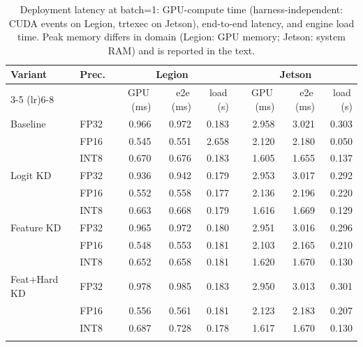 \begin{table}[t]
\centering
\caption{Deployment latency at batch=1: GPU-compute time (harness-independent: CUDA events on Legion, trtexec on Jetson), end-to-end latency, and engine load time. Peak memory differs in domain (Legion: GPU memory; Jetson: system RAM) and is reported in the text.}
\label{tab:deploy}
\begin{tabular}{llrrrrrr}
\toprule
Variant & Prec. & \multicolumn{3}{c}{\textbf{Legion}} & \multicolumn{3}{c}{\textbf{Jetson}} \\
\cmidrule(lr){3-5} \cmidrule(lr){6-8}
 &  & GPU\,(ms) & e2e\,(ms) & load\,(s) & GPU\,(ms) & e2e\,(ms) & load\,(s) \\
\midrule
Baseline & FP32 & 0.966 & 0.972 & 0.183 & 2.958 & 3.021 & 0.303 \\
 & FP16 & 0.545 & 0.551 & 2.658 & 2.120 & 2.180 & 0.050 \\
 & INT8 & 0.670 & 0.676 & 0.183 & 1.605 & 1.655 & 0.137 \\
\addlinespace[2pt]
Logit KD & FP32 & 0.936 & 0.942 & 0.179 & 2.953 & 3.017 & 0.292 \\
 & FP16 & 0.552 & 0.558 & 0.177 & 2.136 & 2.196 & 0.220 \\
 & INT8 & 0.663 & 0.668 & 0.179 & 1.616 & 1.669 & 0.129 \\
\addlinespace[2pt]
Feature KD & FP32 & 0.965 & 0.972 & 0.180 & 2.951 & 3.016 & 0.296 \\
 & FP16 & 0.548 & 0.553 & 0.181 & 2.103 & 2.165 & 0.210 \\
 & INT8 & 0.652 & 0.658 & 0.181 & 1.620 & 1.670 & 0.130 \\
\addlinespace[2pt]
Feat+Hard KD & FP32 & 0.978 & 0.985 & 0.183 & 2.950 & 3.013 & 0.301 \\
 & FP16 & 0.556 & 0.561 & 0.181 & 2.123 & 2.183 & 0.207 \\
 & INT8 & 0.687 & 0.728 & 0.178 & 1.617 & 1.670 & 0.130 \\
\addlinespace[2pt]
\bottomrule
\end{tabular}
\end{table}

